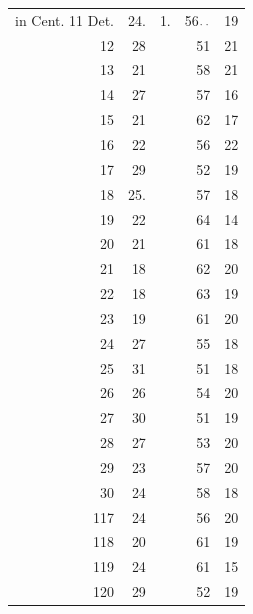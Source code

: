 \begin{longtable}{@{}rrrrr@{}}
in Cent. 11 Det. & 24. & 1. & 56\(\mathinner{.\,.}\) & 19\\
12 & 28 &  & 51 & 21\\
13 & 21 &  & 58 & 21\\
14 & 27 &  & 57 & 16\\
15 & 21 &  & 62 & 17\\
16 & 22 &  & 56 & 22\\
17 & 29 &  & 52 & 19\\
18 & 25. &  & 57 & 18\\
19 & 22 &  & 64 & 14\\
20 & 21 &  & 61 & 18\\
21 & 18 &  & 62 & 20\\
22 & 18 &  & 63 & 19\\
23 & 19 &  & 61 & 20\\
24 & 27 &  & 55 & 18\\
25 & 31 &  & 51 & 18\\
26 & 26 &  & 54 & 20\\
27 & 30 &  & 51 & 19\\
28 & 27 &  & 53 & 20\\
29 & 23 &  & 57 & 20\\
30 & 24 &  & 58 & 18\\
117 & 24 &  & 56 & 20\\
118 & 20 &  & 61 & 19\\
119 & 24 &  & 61 & 15\\
120 & 29 &  & 52 & 19\\
\end{longtable}
